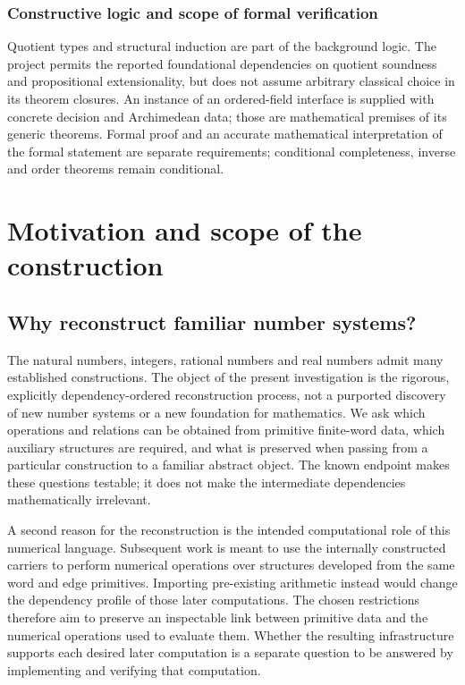 \documentclass[11pt,reqno]{amsart}
\theoremstyle{definition}\newtheorem{definition}[theorem]{Definition}
\theoremstyle{remark}\newtheorem{remark}[theorem]{Remark}
\begin{document}
\subsubsection*{Constructive logic and scope of formal verification}\label{supp:1-4}
Quotient types and structural induction are part of the background logic. The project permits the reported foundational dependencies on quotient soundness and propositional extensionality, but does not assume arbitrary classical choice in its theorem closures. An instance of an ordered-field interface is supplied with concrete decision and Archimedean data; those are mathematical premises of its generic theorems. Formal proof and an accurate mathematical interpretation of the formal statement are separate requirements; conditional completeness, inverse and order theorems remain conditional.
\medskip

\clearpage
\section{Motivation and scope of the construction}\label{sec:motivation}
\subsection{Why reconstruct familiar number systems?}
The natural numbers, integers, rational numbers and real numbers admit many established constructions. The object of the present investigation is the rigorous, explicitly dependency-ordered reconstruction process, not a purported discovery of new number systems or a new foundation for mathematics. We ask which operations and relations can be obtained from primitive finite-word data, which auxiliary structures are required, and what is preserved when passing from a particular construction to a familiar abstract object. The known endpoint makes these questions testable; it does not make the intermediate dependencies mathematically irrelevant.

A second reason for the reconstruction is the intended computational role of this numerical language. Subsequent work is meant to use the internally constructed carriers to perform numerical operations over structures developed from the same word and edge primitives. Importing pre-existing arithmetic instead would change the dependency profile of those later computations. The chosen restrictions therefore aim to preserve an inspectable link between primitive data and the numerical operations used to evaluate them. Whether the resulting infrastructure supports each desired later computation is a separate question to be answered by implementing and verifying that computation.
\end{document}
